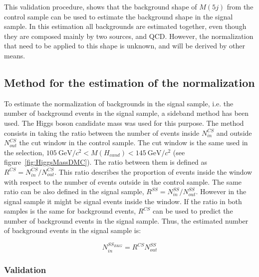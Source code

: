 This validation procedure, shows that the background shape of $M(5j)$ from the control sample can be used to estimate the background shape in the signal sample. In this estimation all backgrounds are estimated together, even though they are composed mainly by two sources, \ttbar and QCD. However, the normalization that need to be applied to this shape is unknown, and will be derived by other means. 

\subsection{Method for the estimation of the normalization}
\label{sec:bkgnormmet}

To estimate the normalization of backgrounds in the signal sample, i.e. the number of background events in the signal sample, a sideband method has been used. The Higgs boson candidate mass was used for this purpose. The method consists in taking the ratio between the number of events inside $N^{CS}_{in}$ and outside $N^{CS}_{out}$ the cut window in the control sample. The cut window is the same used in the selection, $105~\text{GeV}/c^{2} <M(H_{cand})<145~\text{GeV}/c^{2}$ (see figure~\ref{fig:HiggsMassDMC}). The ratio between them is defined as $R^{CS}=N^{CS}_{in}/N^{CS}_{out}$. This ratio describes the proportion of events inside the window with respect to the number of events outside in the control sample. The same ratio can be also defined in the signal sample, $R^{SS}=N^{SS}_{in}/N^{SS}_{out}$. However in the signal sample it might be signal events inside the window. If the ratio in both samples is the same for background events, $R^{CS}$ can be used to predict the number of background events in the signal sample. Thus, the estimated number of background events in the signal sample is:

\begin{equation}
  \label{eq:NormMethod}
  N^{SS_{BKG}}_{in}=R^{CS}N^{SS}_{out}
\end{equation}

\subsubsection{Validation}
\label{sec:normval}

